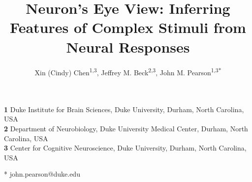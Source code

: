 \documentclass[12pt,a4paper]{article}
\date{}
\begin{document}


\title{Neuron's Eye View: Inferring Features of Complex Stimuli from Neural Responses}
\author{Xin (Cindy) Chen\textsuperscript{1,3}, Jeffrey M. Beck\textsuperscript{2,3}, John M. Pearson\textsuperscript{1,3*}}
\maketitle

\noindent
\textbf{1} Duke Institute for Brain Sciences, Duke University, Durham, North Carolina, USA
\\
\textbf{2} Department of Neurobiology, Duke University Medical Center, Durham, North Carolina, USA
\\
\textbf{3} Center for Cognitive Neuroscience, Duke University, Durham, North Carolina, USA

%
%


\noindent
* john.pearson@duke.edu

\end{document}
